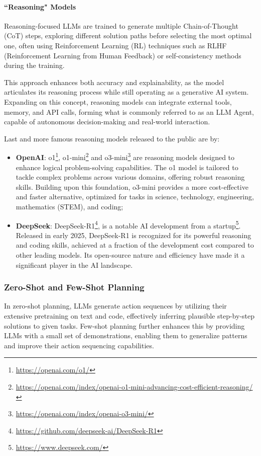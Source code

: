 \paragraph{``Reasoning" Models}
Reasoning-focused LLMs are trained to generate multiple Chain-of-Thought (CoT)
steps, exploring different solution paths before selecting the most optimal one,
often using Reinforcement Learning (RL)
\cite{deepseekai2025deepseekr1incentivizingreasoningcapability} techniques such
as RLHF (Reinforcement Learning from Human Feedback) or self-consistency methods
during the training.

This approach enhances both accuracy and explainability, as the model articulates
its reasoning process while still operating as a generative AI system. Expanding
on this concept, reasoning models can integrate external tools, memory, and API calls,
forming what is commonly referred to as an LLM Agent, capable of autonomous decision-making
and real-world interaction.

Last and more famous reasoning models released to the public are by:
\begin{itemize}
  \item \textbf{OpenAI}: o1\footnote{\url{https://openai.com/o1/}}, o1-mini\footnote{\url{https://openai.com/index/openai-o1-mini-advancing-cost-efficient-reasoning/}}
    and o3-mini\footnote{\url{https://openai.com/index/openai-o3-mini/}} are reasoning
    models designed to enhance logical problem-solving capabilities. The o1
    model is tailored to tackle complex problems across various domains, offering
    robust reasoning skills. Building upon this foundation, o3-mini provides a more
    cost-effective and faster alternative, optimized for tasks in science, technology,
    engineering, mathematics (STEM), and coding;

  \item \textbf{DeepSeek}: DeepSeek-R1\footnote{\url{https://github.com/deepseek-ai/DeepSeek-R1}},
    is a notable AI development from a startup\footnote{\url{https://www.deepseek.com/}}.
    Released in early 2025, DeepSeek-R1 is recognized for its powerful reasoning
    and coding skills, achieved at a fraction of the development cost compared to
    other leading models. Its open-source nature and efficiency have made it a
    significant player in the AI landscape.
\end{itemize}

\subsubsection{Zero-Shot and Few-Shot Planning}
In zero-shot planning, LLMs generate action sequences by utilizing their
extensive pretraining on text and code, effectively inferring plausible step-by-step
solutions to given tasks. Few-shot planning further enhances this by providing
LLMs with a small set of demonstrations, enabling them to generalize patterns and
improve their action sequencing capabilities.

